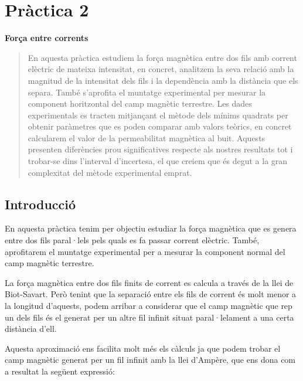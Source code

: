 \documentclass[11pt]{article}
\numberwithin{equation}{section}
\numberwithin{figure}{section}
\numberwithin{table}{section}
\begin{document}
\newpage
\section{\huge \textbf{Pràctica 2}}

{}  %

\vspace{0.5em}  %

{\Huge \textbf{Força entre corrents}}  %

\vspace{1em}  %

\begin{abstract}
    En aquesta pràctica estudiem la força magnètica entre dos fils amb corrent elèctric de mateixa intensitat, en concret, analitzem la seva relació amb la magnitud de la intensitat dels fils i la dependència amb la distància que els separa. També s'aprofita el muntatge experimental per mesurar la component horitzontal del camp magnètic terrestre. Les dades experimentals es tracten mitjançant el mètode dels mínims quadrats per obtenir paràmetres que es poden comparar amb valors teòrics, en concret calcularem el valor de la permeabilitat magnètica al buit. Aquests presenten diferències prou significatives respecte als nostres resultats tot i trobar-se dins l'interval d'incertesa, el que creiem que és degut a la gran complexitat del mètode experimental emprat.
\end{abstract}

\subsection{Introducció}\label{sec: PR2_intro}

En aquesta pràctica tenim per objectiu estudiar la força magnètica que es genera entre dos fils paral·lels pels quals es fa passar corrent elèctric. També, aprofitarem el muntatge experimental per a mesurar la component normal del camp magnètic terrestre.

La força magnètica entre dos fils finits de corrent es calcula a través de la llei de Biot-Savart. Però tenint que la separació entre els fils de corrent és molt menor a la longitud d'aquests, podem arribar a considerar que el camp magnètic que rep un dels fils és el generat per un altre fil infinit situat paral·lelament a una certa distància d'ell. 

Aquesta aproximació ens facilita molt més els càlculs ja que podem trobar el camp magnètic generat per un fil infinit amb la llei d'Ampère, que ens dona com a resultat la següent expressió:
\end{document}
